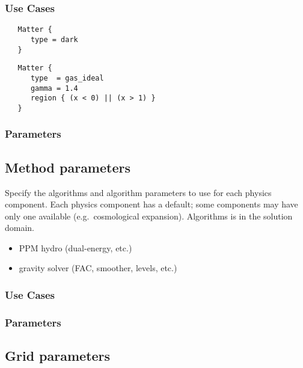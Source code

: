 \subsubsection{Use Cases}

\begin{verbatim}
   Matter {
      type = dark
   }
\end{verbatim}

\begin{verbatim}
   Matter {
      type  = gas_ideal
      gamma = 1.4
      region { (x < 0) || (x > 1) }
   }
\end{verbatim}

\subsubsection{Parameters}

\subsection{Method parameters}

 Specify the algorithms and algorithm parameters
 to use for each physics component.  Each physics component has a
 default; some components may have only one available
 (e.g.~cosmological expansion).  Algorithms is in the solution domain.

\begin{itemize}
\item PPM hydro (dual-energy, etc.)
\item gravity solver (FAC, smoother, levels, etc.)
\end{itemize}

\subsubsection{Use Cases}
\subsubsection{Parameters}

\subsection{Grid parameters} \label{ss:params-grid}


